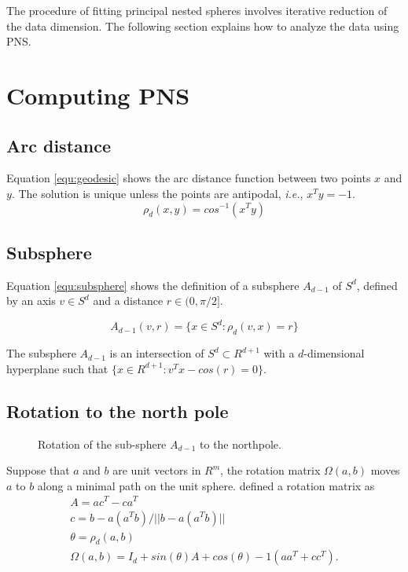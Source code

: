 The procedure of fitting principal nested spheres involves iterative reduction of the data 
dimension.
The following section explains how to analyze the data using PNS.

\section{Computing PNS}

\subsection{Arc distance}

Equation \ref{equ:geodesic} shows the arc distance function between two points $x$ and $y$. The solution is unique unless
the points are antipodal, \textit{i.e.}, $x^Ty = -1$.
\begin{equation}
 \rho_d(x, y) = cos^{-1}(x^Ty)
 \label{equ:geodesic}
\end{equation}

\subsection{Subsphere}

Equation \ref{equ:subsphere} shows the definition
of a subsphere $A_{d-1}$ of $S^d$, 
defined by an axis $v \in S^d$ and a distance $r \in (0, \pi/2]$.

\begin{equation}
 A_{d-1}(v, r) = \{x \in S^d :  \rho_d(v, x) = r \}
 \label{equ:subsphere}
\end{equation}

The subsphere $A_{d-1}$ is an intersection of $S^d \subset R^{d+1}$
with a $d$-dimensional hyperplane such that $\{x \in R^{d+1}: v^Tx - cos(r) = 0\}$.

\subsection{Rotation to the north pole}

\begin{figure} 
 \centering 
 \caption{Rotation of the sub-sphere $A_{d-1}$ to the northpole.}
 \label{fig:rotateNorth}  
\end{figure}

Suppose that $a$ and $b$ are unit vectors in $R^m$, the rotation matrix $\Omega(a, b)$
moves $a$ to $b$ along a minimal path on the unit sphere.
\cite{amaral2007pivotal} defined a rotation matrix as
\begin{equation}
   \begin{array}{r}
      A = ac^T - ca^T\\
      c = {b - a(a^T b)}/||b - a(a^T b)||\\
      \theta = \rho_d(a, b)\\
      \Omega(a, b) = I_d + sin(\theta)A + {cos(\theta) - 1}(aa^T + cc^T).
    \end{array}
 \label{equ:rotateNorth}
\end{equation}

